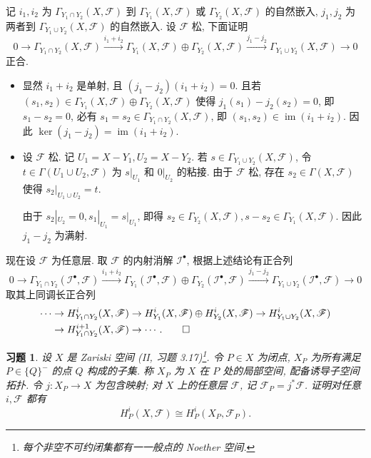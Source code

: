 \documentclass{article}
\theoremstyle{exercise}
\newtheorem{exercise}{习题}[section]
\theoremstyle{plain}
\theoremstyle{remark}
\newenvironment{proofc}{\proof}{\endproof}
\def\printfootnotes{}
\def\sF{\mathscr{F}}
\def\sI{\mathscr{I}}
\def\im{\operatorname{im}}
\def\clearfootnotes{}
\begin{document}
\begin{proofc}
  记 $i_1, i_2$ 为 $\Gamma_{Y_1 \cap Y_2}(X, \sF)$ 到
  $\Gamma_{Y_1}(X, \sF)$ 或 $\Gamma_{Y_2}(X, \sF)$ 的自然嵌入,
  $j_1, j_2$ 为两者到 $\Gamma_{Y_1 \cup Y_2}(X, \sF)$ 的自然嵌入.
  设 $\sF$ 松, 下面证明
  \[
    0 \to \Gamma_{Y_1 \cap Y_2}(X, \sF)
    \xrightarrow{i_1 + i_2} \Gamma_{Y_1}(X, \sF) \oplus \Gamma_{Y_2}(X, \sF)
    \xrightarrow{j_1 - j_2} \Gamma_{Y_1 \cup Y_2}(X, \sF) \to 0
  \]
  正合.

  \begin{itemize}
    \item 显然 $i_1 + i_2$ 是单射, 且 $(j_1 - j_2)(i_1 + i_2) = 0$.
          且若 $(s_1, s_2) \in \Gamma_{Y_1}(X, \sF) \oplus \Gamma_{Y_2}(X, \sF)$
          使得 $j_1(s_1) - j_2(s_2) = 0$, 即 $s_1 - s_2 = 0$,
          必有 $s_1 = s_2 \in \Gamma_{Y_1 \cap Y_2}(X, \sF)$,
          即 $(s_1, s_2) \in \im(i_1 + i_2)$.
          因此 $\ker(j_1 - j_2) = \im(i_1 + i_2)$.
    \item 设 $\sF$ 松. 记 $U_1 = X - Y_1, U_2 = X - Y_2$.
          若 $s \in \Gamma_{Y_1 \cup Y_2}(X, \sF)$,
          令 $t \in \Gamma(U_1 \cup U_2, \sF)$
          为 $s|_{U_1}$ 和 $0|_{U_2}$ 的粘接.
          由于 $\sF$ 松, 存在 $s_2 \in \Gamma(X, \sF)$
          使得 $s_2|_{U_1 \cup U_2} = t$.

          由于 $s_2|_{U_2} = 0, s_1|_{U_1} = s|_{U_1}$,
          即得 $s_2 \in \Gamma_{Y_2}(X, \sF), s - s_2 \in \Gamma_{Y_1}(X, \sF)$.
          因此 $j_1 - j_2$ 为满射.
  \end{itemize}

  现在设 $\sF$ 为任意层. 取 $\sF$ 的内射消解 $\sI^\bullet$, 根据上述结论有正合列
  \[
    0 \to \Gamma_{Y_1 \cap Y_2}(\sI^\bullet, \sF)
    \xrightarrow{i_1 + i_2} \Gamma_{Y_1}(\sI^\bullet, \sF) \oplus \Gamma_{Y_2}(\sI^\bullet, \sF)
    \xrightarrow{j_1 - j_2} \Gamma_{Y_1 \cup Y_2}(\sI^\bullet, \sF) \to 0
  \]
  取其上同调长正合列
    \begin{align*}
      \cdots & \to H^i_{Y_1 \cap Y_2}(X, \sF)
               \to H^i_{Y_1}(X, \sF) \oplus H^i_{Y_2}(X, \sF)
               \to H^i_{Y_1 \cup Y_2}(X, \sF) \\
             & \to H^{i+1}_{Y_1 \cap Y_2}(X, \sF) \to \cdots.
    \qedhere
    \end{align*}
\end{proofc}

\begin{exercise}
  设 $X$ 是 Zariski 空间 (II, 习题 3.17)\footnote{每个非空不可约闭集都有一一般点的 Noether 空间.}.
  令 $P \in X$ 为闭点, $X_P$ 为所有满足 $P \in \{Q\}^-$ 的点 $Q$ 构成的子集.
  称 $X_P$ 为 $X$ 在 $P$ 处的\emph{局部空间}, 配备诱导子空间拓扑.
  令 $j \colon X_P \to X$ 为包含映射; 对 $X$ 上的任意层 $\sF$, 记 $\sF_P = j^* \sF$.
  证明对任意 $i, \sF$ 都有
  \[
    H_P^i(X, \sF) \cong H_P^i(X_P, \sF_P).
  \]
\end{exercise}
\printfootnotes
\clearfootnotes
\end{document}
